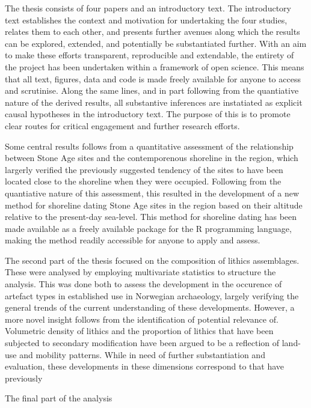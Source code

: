 The thesis consists of four papers and an introductory text. The introductory text establishes the context and motivation for undertaking the four studies, relates them to each other, and presents further avenues along which the results can be explored, extended, and potentially be substantiated further. With an aim to make these efforts transparent, reproducible and extendable, the entirety of the project has been undertaken within a framework of open science. This means that all text, figures, data and code is made freely available for anyone to access and scrutinise. Along the same lines, and in part following from the quantiative nature of the derived results, all substantive inferences are instatiated as explicit causal hypotheses in the introductory text. The purpose of this is to promote clear routes for critical engagement and further research efforts.  

Some central results follows from a quantitative assessment of the relationship between Stone Age sites and the contemporenous shoreline in the region,  which largerly verified the previously suggested tendency of the sites to have been located close to the shoreline when they were occupied. Following from the quantiative nature of this assessment, this resulted in the development of a new method for shoreline dating Stone Age sites in the region based on their altitude relative to the present-day sea-level. This method for shoreline dating has been made available as a freely available package for the R programming language, making the method readily accessible for anyone to apply and assess. 

The second part of the thesis focused on the composition of lithics assemblages. These were analysed by employing multivariate statistics to structure the analysis. This was done both to assess the development in the occurence of artefact types in established use in Norwegian archaeology, largely verifying the general trends of the current understanding of these developments. However, a more novel insight follows from the identification of potential relevance of. Volumetric density of lithics and the proportion of lithics that have been subjected to secondary modification have been argued to be a reflection of land-use and mobility patterns. While in need of further substantiation and evaluation, these developments in these dimensions correspond to that have previously

The final part of the analysis 


\tableofcontents

